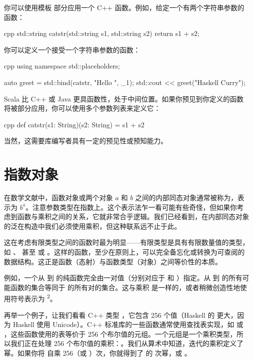 你可以使用模板  部分应用一个 C++ 函数。例如，给定一个有两个字符串参数的函数：

\begin{snip}{cpp}
  std::string catstr(std::string s1, std::string s2) {
    return s1 + s2;
  }
\end{snip}
你可以定义一个接受一个字符串参数的函数：

\begin{snip}{cpp}
  using namespace std::placeholders;

  auto greet = std::bind(catstr, "Hello ", _1);
  std::cout << greet("Haskell Curry");
\end{snip}
Scala 比 C++ 或 Java 更具函数性，处于中间位置。如果你预见到你定义的函数将被部分应用，你可以使用多个参数列表来定义它：

\begin{snip}{cpp}
  def catstr(s1: String)(s2: String) = s1 + s2
\end{snip}
当然，这需要库编写者具有一定的预见性或预知能力。

\section{指数对象}

在数学文献中，函数对象或两个对象 $a$ 和 $b$ 之间的内部同态对象通常被称为，表示为 $b^{a}$。注意参数类型在指数上。这个表示法乍一看可能有些奇怪，但如果你考虑到函数与乘积之间的关系，它就非常合乎逻辑。我们已经看到，在内部同态对象的泛在构造中我们必须使用乘积，但这种联系远不止于此。

这在考虑有限类型之间的函数时最为明显——有限类型是具有有限数量值的类型，如 、 甚至  或 。这样的函数，至少在原则上，可以完全备忘化或转换为可查阅的数据结构。这正是函数（态射）与函数类型（对象）之间等价性的本质。

例如，一个从  到  的纯函数完全由一对值（分别对应于  和 ）指定。从  到  的所有可能函数的集合等同于  的所有对的集合。这与乘积  \times{}  是一样的，或者稍微创造性地使用符号表示为 \textsuperscript{2}。

再举一个例子，让我们看看 C++ 类型 ，它包含 256 个值（Haskell 的  更大，因为 Haskell 使用 Unicode）。C++ 标准库的一些函数通常使用查找表实现，如  或 ，这些函数使用的表等价于 256 个布尔值的元组。一个元组是一个乘积类型，所以我们正在处理 256 个布尔值的乘积：。我们从算术中知道，迭代的乘积定义了幂。如果你将  自乘 256（或 ）次，你就得到了  的  次幂，或 \textsuperscript{}。

